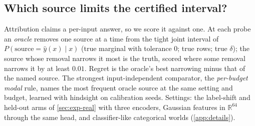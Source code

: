 \subsection{Which source limits the certified interval?}
\label{sec:exp-attribution}

Attribution claims a per-input answer, so we score it against one. At each probe an \emph{oracle} removes
one source at a time from the tight joint interval of $P(\text{source}=\hat y(x)\mid x)$ (true marginal with
tolerance $0$; true rows; true $\delta$); the source whose removal narrows it most is the truth, scored where
some removal narrows it by at least $0.01$. Regret is the oracle's best narrowing minus that of the named
source. The strongest input-independent comparator, the \emph{per-budget modal} rule, names the most frequent
oracle source at the same setting and budget, learned with hindsight on calibration seeds. Settings: the
label-shift and held-out arms of \cref{sec:exp-real} with three encoders, Gaussian features in $\mathbb R^{64}$ through the same head, and
classifier-like categorical worlds (\cref{app:details}).

\begin{table}[t]
\centering\small
\caption{Oracle regret (width units, evaluation seeds) of naming the source that limits the certified
interval. Raw widths: argmax of $(\Wcls,\Wlab,\Wunk)$; radius: data-free bookkeeping; modal: most frequent
oracle source per setting and budget (hindsight). CI: two-way bootstrap over seeds and settings.}
\label{tab:attribution}
\setlength{\tabcolsep}{2.5pt}
\resizebox{\columnwidth}{!}{}
\end{table}


